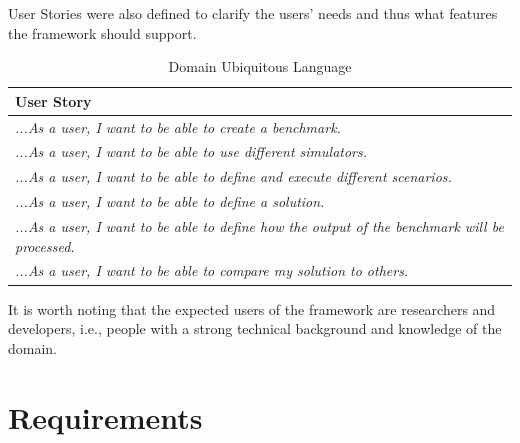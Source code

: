 \documentclass[12pt,a4paper,openright,twoside]{book}
\begin{document}
User Stories were also defined to clarify the users' needs and thus what features the framework should support.

\begin{table}[H]
  \centering
  \begin{tabular}{|p{}|}
    \toprule
    \textbf{User Story}                                                                                   \\
    \midrule
    \textit{...As a user, I want to be able to create a benchmark.}                                       \\ \hline
    \textit{...As a user, I want to be able to use different simulators.}                                 \\ \hline
    \textit{...As a user, I want to be able to define and execute different scenarios.}                   \\ \hline
    \textit{...As a user, I want to be able to define a solution.}                                        \\ \hline
    \textit{...As a user, I want to be able to define how the output of the benchmark will be processed.} \\ \hline
    \textit{...As a user, I want to be able to compare my solution to others.}                       \\ \hline
  \end{tabular}
  \caption{Domain Ubiquitous Language}
\end{table}

It is worth noting that the expected users of the framework are researchers and developers, i.e., people with a strong technical background and knowledge of the domain.

\section{Requirements}
\end{document}
